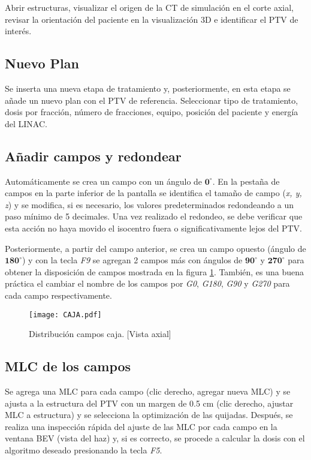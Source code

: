 \documentclass{article}
\begin{document}
Abrir estructuras, visualizar el origen de la CT de simulación en el corte axial, revisar la orientación del paciente en la visualización 3D e identificar el PTV de interés.

\subsection{Nuevo Plan}

Se inserta una nueva etapa de tratamiento y, posteriormente, en esta etapa se añade un nuevo plan con el PTV de referencia. Seleccionar tipo de tratamiento, dosis por fracción, número de fracciones, equipo, posición del paciente y energía del LINAC.

\subsection{Añadir campos y redondear}

Automáticamente se crea un campo con un ángulo de $\mathbf{0^{\circ}}$. En la pestaña de campos en la parte inferior de la pantalla se identifica el tamaño de campo (\textit{x, y, z}) y se modifica, si es necesario, los valores predeterminados redondeando a un paso mínimo de 5 decimales. Una vez realizado el redondeo, se debe verificar que esta acción no haya movido el isocentro fuera o significativamente lejos del PTV.

Posteriormente, a partir del campo anterior, se crea un campo opuesto (ángulo de $\mathbf{180^{\circ}}$) y con la tecla \textit{F9} se agregan 2 campos más con ángulos de $\mathbf{90^{\circ}}$ y $\mathbf{270^{\circ}}$ para obtener la disposición de campos mostrada en la figura \ref{CAJA}. También, es una buena práctica el cambiar el nombre de los campos por \textit{G0}, \textit{G180}, \textit{G90} y \textit{G270} para cada campo respectivamente.

\begin{figure}[!ht]
    \centering
    \texttt{[image: CAJA.pdf]}
    \caption{Distribución campos caja. [Vista axial]}
    \label{CAJA}
\end{figure}

\subsection{MLC de los campos}

Se agrega una MLC para cada campo (clic derecho, agregar nueva MLC) y se ajusta a la estructura del PTV con un margen de 0.5 cm (clic derecho, ajustar MLC a estructura) y se selecciona la optimización de las quijadas. Después, se realiza una inspección rápida del ajuste de las MLC por cada campo en la ventana BEV (vista del haz) y, si es correcto, se procede a calcular la dosis con el algoritmo deseado presionando la tecla \textit{F5}.
\end{document}
